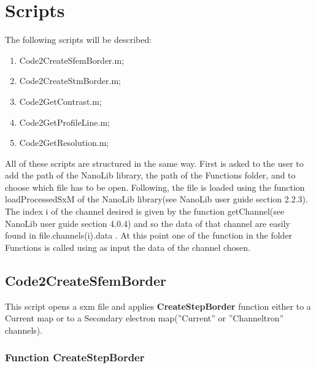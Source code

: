 \section{Scripts}

The following scripts will be described:

\begin{enumerate}
	\item Code2CreateSfemBorder.m;
	\item Code2CreateStmBorder.m;
	\item Code2GetContrast.m;
	\item Code2GetProfileLine.m;
	\item Code2GetResolution.m;
	\end{enumerate}

All of these scripts are structured in the same way. First is asked to the user to add the path of the NanoLib library, the path of the Functions folder, and to choose which file has to be open.
Following, the file is loaded using the function loadProcessedSxM of the NanoLib library(see NanoLib user guide section 2.2.3). The index i of the channel desired is given by the function getChannel(see NanoLib user guide section 4.0.4) and so the data of that channel are easily found in file.channels(i).data . At this point one of the function in the folder Functions is called using as input the data of the channel chosen.

\subsection{Code2CreateSfemBorder}

This script opens a sxm file and applies \textbf{CreateStepBorder} function either to a Current map or to a Secondary electron map(''Current'' or ''Channeltron'' channels).

\subsubsection{Function CreateStepBorder}

